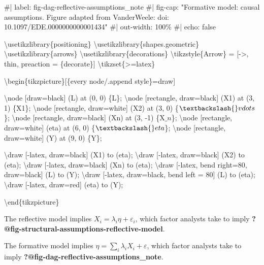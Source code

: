 \documentclass[
  letterpaper,
  DIV=11,
  numbers=noendperiod]{scrartcl}
\newenvironment{Shaded}{\begin{snugshade}}{\end{snugshade}}
\newcommand{\NormalTok}[1]{\textcolor[rgb]{0.00,0.23,0.31}{#1}}
\begin{document}
\begin{Shaded}
\begin{Highlighting}[]
\NormalTok{\#| label: fig{-}dag{-}reflective{-}assumptions\_note}
\NormalTok{\#| fig{-}cap: "Formative model: causal assumptions. Figure adapted from VanderWeele: doi: 10.1097/EDE.0000000000001434"}
\NormalTok{\#| out{-}width: 100\%}
\NormalTok{\#| echo: false}

\NormalTok{\textbackslash{}usetikzlibrary\{positioning\}}
\NormalTok{\textbackslash{}usetikzlibrary\{shapes.geometric\}}
\NormalTok{\textbackslash{}usetikzlibrary\{arrows\}}
\NormalTok{\textbackslash{}usetikzlibrary\{decorations\}}
\NormalTok{\textbackslash{}tikzstyle\{Arrow\} = [{-}\textgreater{}, thin, preaction = \{decorate\}]}
\NormalTok{\textbackslash{}tikzset\{\textgreater{}=latex\}}

\NormalTok{\textbackslash{}begin\{tikzpicture\}[\{every node/.append style\}=draw]}


\NormalTok{\textbackslash{}node [draw=black] (L) at (0, 0) \{L\};}
\NormalTok{\textbackslash{}node [rectangle, draw=black] (X1) at (3, 1) \{X1\};}
\NormalTok{\textbackslash{}node [rectangle, draw=white] (X2) at (3, 0) \{$\textbackslash{}vdots$\};}
\NormalTok{\textbackslash{}node [rectangle, draw=black] (Xn) at (3, {-}1) \{X$\_n$\};}
\NormalTok{\textbackslash{}node [rectangle, draw=white] (eta) at (6, 0) \{$\textbackslash{}eta$\};}
\NormalTok{\textbackslash{}node [rectangle, draw=white] (Y) at (9, 0) \{Y\};}



\NormalTok{\textbackslash{}draw [{-}latex, draw=black] (X1) to (eta);}
\NormalTok{\textbackslash{}draw [{-}latex, draw=black] (X2) to (eta);}
\NormalTok{\textbackslash{}draw [{-}latex, draw=black] (Xn) to (eta);}
\NormalTok{\textbackslash{}draw [{-}latex, bend right=80, draw=black] (L) to (Y);}
\NormalTok{\textbackslash{}draw [{-}latex, draw=black, bend left = 80] (L) to (eta);}
\NormalTok{\textbackslash{}draw [{-}latex, draw=red] (eta) to (Y);}


\NormalTok{\textbackslash{}end\{tikzpicture\}}
\end{Highlighting}
\end{Shaded}

The reflective model implies \(X_i = \lambda_i \eta + \varepsilon_i\),
which factor analysts take to imply
\textbf{?@fig-structural-assumptions-reflective-model}.

The formative model implies
\(\eta = \sum_i\lambda_i X_i + \varepsilon\), which factor analysts take
to imply \textbf{?@fig-dag-reflective-assumptions\_note}.
\end{document}
